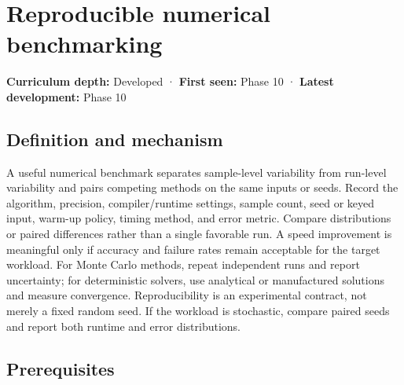 \hypertarget{appendix-b9db93e28371}{}\label{referencestart:appendix-b9db93e28371}
\section{Reproducible numerical benchmarking}\label{appendix-b9db93e28371-reproducible-numerical-benchmarking}

\hypertarget{appendix-b9db93e28371-reproducible-numerical-benchmarking}{}

\textbf{Curriculum depth:} Developed · \textbf{First seen:} Phase 10 · \textbf{Latest development:} Phase 10

\begin{allmightroledefinition}

\subsection{Definition and mechanism}\label{appendix-b9db93e28371-definition-and-mechanism}

\hypertarget{appendix-b9db93e28371-definition-and-mechanism}{}

A useful numerical benchmark separates sample-level variability from run-level variability and pairs competing methods on the same inputs or seeds. Record the algorithm, precision, compiler/runtime settings, sample count, seed or keyed input, warm-up policy, timing method, and error metric. Compare distributions or paired differences rather than a single favorable run. A speed improvement is meaningful only if accuracy and failure rates remain acceptable for the target workload. For Monte Carlo methods, repeat independent runs and report uncertainty; for deterministic solvers, use analytical or manufactured solutions and measure convergence. Reproducibility is an experimental contract, not merely a fixed random seed. If the workload is stochastic, compare paired seeds and report both runtime and error distributions.

\end{allmightroledefinition}

\subsection{Prerequisites}\label{appendix-b9db93e28371-prerequisites}

\hypertarget{appendix-b9db93e28371-prerequisites}{}


